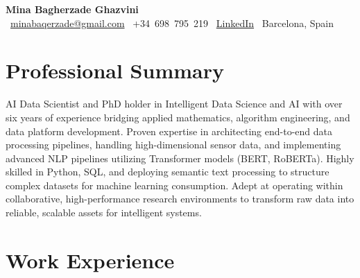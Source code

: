 \documentclass[11pt,a4paper]{article}
\begin{document}
\begin{center}
    {\LARGE\bfseries\color{headerblue} Mina Bagherzade Ghazvini}\\[4pt]
    \faEnvelope~\href{mailto:minabaqerzade@gmail.com}{minabaqerzade@gmail.com} \quad
    \faMobile~{+34~698~795~219} \quad
    \faLinkedin~\href{https://linkedin.com/in/mbgh/}{LinkedIn} \quad
    \faMapMarker*~Barcelona, Spain
\end{center}

\vspace{2mm}
\section{Professional Summary}
AI Data Scientist and PhD holder in Intelligent Data Science and AI with over six years of experience bridging applied mathematics, algorithm engineering, and data platform development. Proven expertise in architecting end-to-end data processing pipelines, handling high-dimensional sensor data, and implementing advanced NLP pipelines utilizing Transformer models (BERT, RoBERTa). Highly skilled in Python, SQL, and deploying semantic text processing to structure complex datasets for machine learning consumption. Adept at operating within collaborative, high-performance research environments to transform raw data into reliable, scalable assets for intelligent systems.

\vspace{2mm}
\section{Work Experience}
\end{document}
